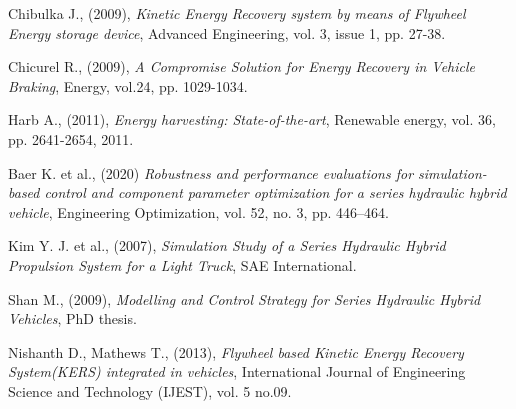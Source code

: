 \documentclass[11pt]{article}
\begin{document}

\newpage

\begin{thebibliography}{60}
	
	
	
	
	
	Chibulka J., (2009), \textit{Kinetic Energy Recovery system by means of Flywheel Energy storage device}, Advanced Engineering, vol. 3, issue 1, pp. 27-38.
	
	Chicurel R., (2009),  \textit{A Compromise Solution for Energy Recovery in Vehicle Braking}, Energy, vol.24, pp. 1029-1034.
	
	Harb A., (2011), \textit{Energy harvesting: State-of-the-art}, 
	Renewable energy, vol. 36, pp. 2641-2654, 2011.
	
	Baer K. et al., (2020) \textit{Robustness and performance evaluations for simulation-based 		control and component parameter optimization for a series hydraulic hybrid vehicle}, Engineering Optimization, vol. 52, no. 3, pp. 446–464.	
	
	Kim Y. J. et al., (2007), \textit{Simulation Study of a Series Hydraulic Hybrid Propulsion System for a Light Truck}, SAE International.
	
	Shan M., (2009), \textit{Modelling and Control Strategy for Series Hydraulic Hybrid Vehicles}, PhD thesis.
	
	Nishanth D., Mathews T., (2013), \textit{Flywheel based Kinetic Energy Recovery System(KERS) 	    integrated in vehicles}, International Journal of Engineering Science and Technology (IJEST), vol. 5 no.09.
	

\end{thebibliography}
\end{document}
